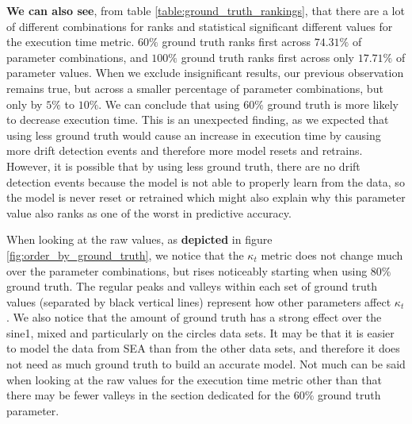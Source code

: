 \textbf{We can also see}, from table \ref{table:ground_truth_rankings}, that there are a lot of different combinations for ranks and statistical significant different values for the execution time metric. $60\%$ ground truth ranks first across $74.31\%$ of parameter combinations, and $100\%$ ground truth ranks first across only $17.71\%$ of parameter values. When we exclude insignificant results, our previous observation remains true, but across a smaller percentage of parameter combinations, but only by $5\%$ to $10\%$. We can conclude that using $60\%$ ground truth is more likely to decrease execution time. This is an unexpected finding, as we expected that using less ground truth would cause an increase in execution time by causing more drift detection events and therefore more model resets and retrains. However, it is possible that by using less ground truth, there are no drift detection events because the model is not able to properly learn from the data, so the model is never reset or retrained which might also explain why this parameter value also ranks as one of the worst in predictive accuracy.

When looking at the raw values, as \textbf{depicted} in figure \ref{fig:order_by_ground_truth}, we notice that the $\kappa_t$ metric does not change much over the parameter combinations, but rises noticeably starting when using $80\%$ ground truth. The regular peaks and valleys within each set of ground truth values (separated by black vertical lines) represent how other parameters affect $\kappa_t$. We also notice that the amount of ground truth has a strong effect over the sine1, mixed and particularly on the circles data sets. It may be that it is easier to model the data from SEA than from the other data sets, and therefore it does not need as much ground truth to build an accurate model. Not much can be said when looking at the raw values for the execution time metric other than that there may be fewer valleys in the section dedicated for the $60\%$ ground truth parameter.

